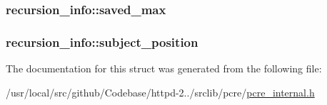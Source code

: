 \subsubsection[{\texorpdfstring{saved\+\_\+max}{saved_max}}]{ recursion\+\_\+info\+::saved\+\_\+max}\hypertarget{structrecursion__info_a242319efb0eeeacbec0b5e0ed7a6be4d}{}\label{structrecursion__info_a242319efb0eeeacbec0b5e0ed7a6be4d}
\subsubsection[{\texorpdfstring{subject\+\_\+position}{subject_position}}]{ recursion\+\_\+info\+::subject\+\_\+position}\hypertarget{structrecursion__info_a8ee1dc479817dee223f0abcf618648c6}{}\label{structrecursion__info_a8ee1dc479817dee223f0abcf618648c6}


The documentation for this struct was generated from the following file\+:\begin{DoxyCompactItemize}
\item 
/usr/local/src/github/\+Codebase/httpd-\/2../srclib/pcre/\hyperlink{pcre__internal_8h}{pcre\+\_\+internal.\+h}\end{DoxyCompactItemize}

